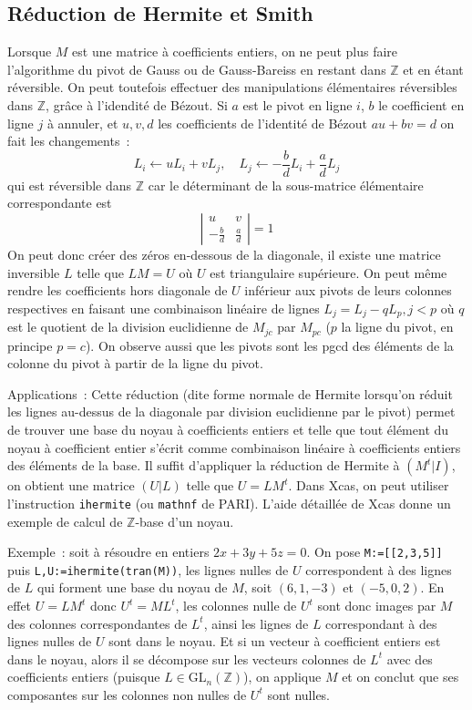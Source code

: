 \documentclass[a4paper,11pt]{book}
\begin{document}
\begin{giacjshere}
\subsection{R\'eduction de Hermite et Smith} 
Lorsque $M$ est une matrice \`a coefficients entiers, 
on ne peut plus faire l'algorithme du pivot de Gauss ou de
Gauss-Bareiss en restant dans $\mathbb{Z}$ et en \'etant r\'eversible.
On peut toutefois effectuer des manipulations \'el\'ementaires
r\'eversibles dans $\mathbb{Z}$, gr\^ace \`a l'idendit\'e de B\'ezout. Si $a$
est le pivot en ligne $i$, $b$ le coefficient en ligne $j$ \`a
annuler, et $u, v, d$ les coefficients de l'identit\'e de B\'ezout
$a u + b v =d$ on fait les changements~:
\[ L_i \leftarrow uL_i +v L_j, \quad 
L_j \leftarrow -\frac{b}{d} L_i + \frac{a}{d} L_j \]
qui est r\'eversible dans $\mathbb{Z}$
car le d\'eterminant de la sous-matrice \'el\'ementaire
correspondante est
\[ \left| \begin{array}{cc}
u & v \\
-\frac{b}{d} & \frac{a}{d}
\end{array} \right| = 1
\]
On peut donc cr\'eer des z\'eros en-dessous de la diagonale, il existe
une matrice inversible $L$ telle que $LM=U$ o\`u $U$ est triangulaire
sup\'erieure. On peut m\^eme rendre les coefficients hors diagonale
de $U$ inf\'erieur aux pivots de leurs colonnes respectives en faisant
une combinaison lin\'eaire de lignes $L_j = L_j-qL_p, j<p$ o\`u $q$
est le quotient de la division euclidienne de $M_{jc}$ par $M_{pc}$
($p$ la ligne du pivot, en principe $p=c$).
On observe aussi que les pivots sont les pgcd des \'el\'ements de la colonne
du pivot \`a partir de la ligne du pivot.

Applications~: 
Cette r\'eduction (dite forme normale de Hermite 
lorsqu'on r\'eduit les lignes
au-dessus de la diagonale par division euclidienne par
le pivot) permet de trouver une base du noyau
\`a coefficients entiers et telle que tout \'el\'ement du noyau \`a 
coefficient entier s'\'ecrit comme combinaison lin\'eaire \`a coefficients
entiers des \'el\'ements de la base. Il suffit d'appliquer la
r\'eduction de Hermite \`a $(M^t|I)$, on obtient une matrice $(U|L)$
telle que $U=LM^t$.
Dans Xcas, on peut utiliser l'instruction \verb|ihermite| (ou
\verb|mathnf| de PARI). L'aide
d\'etaill\'ee de Xcas donne un exemple de calcul de $\mathbb{Z}$-base
d'un noyau. 

Exemple~: soit \`a r\'esoudre en entiers $2x+3y+5z=0$.
On pose \verb|M:=[[2,3,5]]| puis 
\verb|L,U:=ihermite(tran(M))|, les lignes nulles de $U$ correspondent
\`a des lignes de $L$ qui forment une base du noyau de $M$, soit
$(6,1,-3)$ et $(-5,0,2)$.
En effet $U=L M^t$ donc $U^t=M L^t$, les colonnes nulle 
de $U^t$ sont donc images par $M$ des colonnes
correspondantes de $L^t$, ainsi les lignes de $L$ correspondant
\`a des lignes nulles de $U$ sont dans le noyau. Et si un vecteur
\`a coefficient entiers est dans le noyau, alors il se d\'ecompose
sur les vecteurs colonnes de $L^t$ avec des coefficients entiers
(puisque $L\in$GL$_n(\mathbb{Z})$), on applique $M$ et on conclut
que ses composantes sur les colonnes non nulles de $U^t$ sont nulles.


\end{giacjshere}
\end{document}
